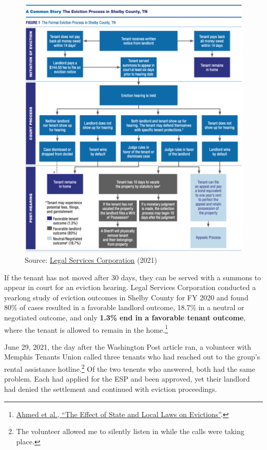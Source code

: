 \documentclass[
  openany]{book}
\begin{document}
\begin{figure}
\centering
\includegraphics{_img/LSC-shelby-evict.png}
\caption{Source: \href{https://www.lsc.gov/press-release/new-nationwide-lsc-eviction-study-examines-variations-local-laws-and-highlights}{Legal Services Corporation} (2021)}
\end{figure}

If the tenant has not moved after 30 days, they can be served with a summons to appear in court for an eviction hearing. Legal Services Corporation conducted a yearlong study of eviction outcomes in Shelby County for FY 2020 and found 80\% of cases resulted in a favorable landlord outcome, 18.7\% in a neutral or negotiated outcome, and only \textbf{1.3\%} \textbf{end in a favorable tenant outcome}, where the tenant is allowed to remain in the home.\footnote{\protect\hyperlink{ref-ahmed2021}{Ahmed et al., {``The Effect of State and Local Laws on Evictions''}}.}

June 29, 2021, the day after the Washington Post article ran, a volunteer with Memphis Tenants Union called three tenants who had reached out to the group's rental assistance hotline.\footnote{The volunteer allowed me to silently listen in while the calls were taking place.} Of the two tenents who answered, both had the same problem. Each had applied for the ESP and been approved, yet their landlord had denied the settlement and continued with eviction proceedings.
\end{document}
